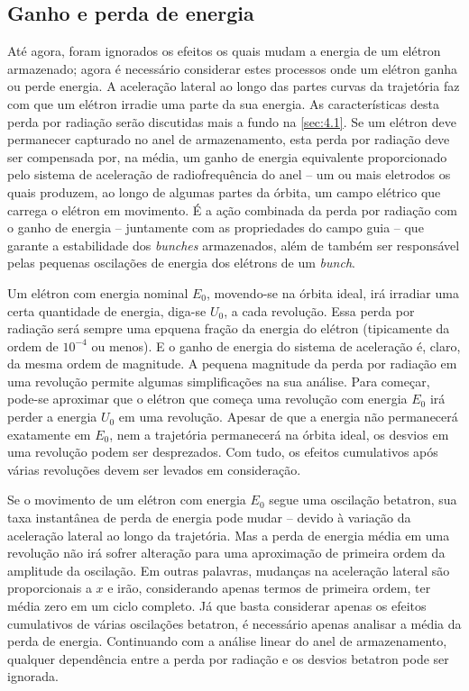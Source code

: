 \subsection{Ganho e perda de energia}
Até agora, foram ignorados os efeitos os quais mudam a energia de um elétron armazenado; agora é necessário considerar estes processos onde um elétron ganha ou perde energia. A aceleração lateral ao longo das partes curvas da trajetória faz com que um elétron irradie uma parte da sua energia. As características desta perda por radiação serão discutidas mais a fundo na \autoref{sec:4.1}. Se um elétron deve permanecer capturado no anel de armazenamento, esta perda por radiação deve ser compensada por, na média, um ganho de energia equivalente proporcionado pelo sistema de aceleração de radiofrequência do anel -- um ou mais eletrodos os quais produzem, ao longo de algumas partes da órbita, um campo elétrico que carrega o elétron em movimento. É a ação combinada da perda por radiação com o ganho de energia -- juntamente com as propriedades do campo guia -- que garante a estabilidade dos \textit{bunches} armazenados, além de também ser responsável pelas pequenas oscilações de energia dos elétrons de um \textit{bunch}.

Um elétron com energia nominal $E_0$, movendo-se na órbita ideal, irá irradiar uma certa quantidade de energia, diga-se $U_0$, a cada revolução. Essa perda por radiação será sempre uma epquena fração da energia do elétron (tipicamente da ordem de $10^{-4}$ ou menos). E o ganho de energia do sistema de aceleração é, claro, da mesma ordem de magnitude. A pequena magnitude da perda por radiação em uma revolução permite algumas simplificações na sua análise. Para começar, pode-se aproximar que o elétron que começa uma revolução com energia $E_0$ irá perder a energia $U_0$ em uma revolução. Apesar de que a energia não permanecerá exatamente em $E_0$, nem a trajetória permanecerá na órbita ideal, os desvios em uma revolução podem ser desprezados. Com tudo, os efeitos cumulativos após várias revoluções devem ser levados em consideração.

Se o movimento de um elétron com energia $E_0$ segue uma oscilação betatron, sua taxa instantânea de perda de energia pode mudar -- devido à variação da aceleração lateral ao longo da trajetória. Mas a perda de energia média em uma revolução não irá sofrer alteração para uma aproximação de primeira ordem da amplitude da oscilação. Em outras palavras, mudanças na aceleração lateral são proporcionais a $x$ e irão, considerando apenas termos de primeira ordem, ter média zero em um ciclo completo. Já que basta considerar apenas os efeitos cumulativos de várias oscilações betatron, é necessário apenas analisar a média da perda de energia. Continuando com a análise linear do anel de armazenamento, qualquer dependência entre a perda por radiação e os desvios betatron pode ser ignorada.

